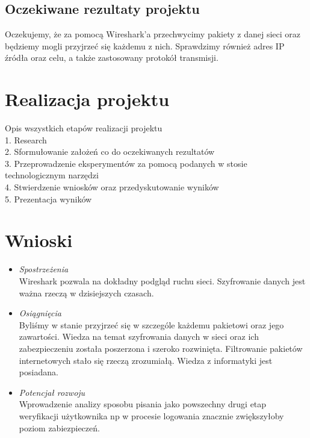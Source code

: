 \documentclass[12pt,a4paper]{article}
\begin{document}
\subsection{Oczekiwane rezultaty projektu}
Oczekujemy, że za pomocą Wireshark'a przechwycimy pakiety z danej sieci oraz będziemy mogli przyjrzeć się każdemu z nich. Sprawdzimy również adres IP źródła oraz celu, a także zastosowany protokół transmisji.
\newpage
\section{Realizacja projektu}
Opis wszystkich etapów realizacji projektu \\
1. Research \\
2. Sformułowanie założeń co do oczekiwanych rezultatów \\
3. Przeprowadzenie eksperymentów za pomocą podanych w stosie technologicznym narzędzi \\
4. Stwierdzenie wniosków oraz przedyskutowanie wyników \\
5. Prezentacja wyników \\
\newpage
\section{Wnioski}
\begin{itemize}
\item \textit{Spostrzeżenia} \\
Wireshark pozwala na dokładny podgląd ruchu sieci. Szyfrowanie danych jest ważna rzeczą w dzisiejszych czasach.
\item \textit{Osiągnięcia}\\
Byliśmy w stanie przyjrzeć się w szczególe każdemu pakietowi oraz jego zawartości.
Wiedza na temat szyfrowania danych w sieci oraz ich zabezpieczeniu została poszerzona i szeroko rozwinięta.
Filtrowanie pakietów internetowych stało się rzeczą zrozumiałą.
Wiedza z informatyki jest posiadana.
\item \textit{Potencjał rozwoju}\\
Wprowadzenie analizy sposobu pisania jako powszechny drugi etap weryfikacji użytkownika np w procesie logowania znacznie zwiększyłoby poziom zabiezpieczeń.
\end{itemize}
\end{document}
